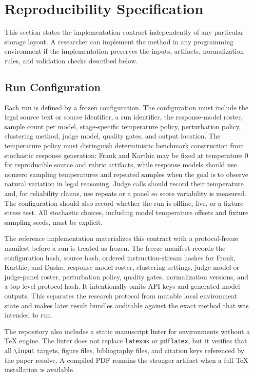 \section{Reproducibility Specification}

This section states the implementation contract independently of any particular
storage layout. A researcher can implement the method in any programming
environment if the implementation preserves the inputs, artifacts, normalization
rules, and validation checks described below.

\subsection{Run Configuration}

Each run is defined by a frozen configuration. The configuration must include
the legal source text or source identifier, a run identifier, the response-model
roster, sample count per model, stage-specific temperature policy,
perturbation policy, clustering method, judge model, quality gates, and output
location. The temperature policy must distinguish deterministic benchmark
construction from stochastic response generation: Frank and Karthic may be
fixed at temperature 0 for reproducible source and rubric artifacts, while
response models should use nonzero sampling temperatures and repeated samples
when the goal is to observe natural variation in legal reasoning. Judge calls
should record their temperature and, for reliability claims, use repeats or a
panel so score variability is measured. The configuration should also record
whether the run is offline, live, or a fixture stress test. All stochastic
choices, including model temperature offsets and fixture sampling seeds, must be
explicit.

The reference implementation materializes this contract with a protocol-freeze
manifest before a run is treated as frozen. The freeze manifest records the
configuration hash, source hash, ordered instruction-stream hashes for Frank,
Karthic, and Dasha, response-model roster, clustering settings, judge model or
judge-panel roster, perturbation policy, quality gates, normalization versions,
and a top-level protocol hash. It intentionally omits API keys and generated
model outputs. This separates the research protocol from mutable local
environment state and makes later result bundles auditable against the exact
method that was intended to run.

The repository also includes a static manuscript linter for environments without
a TeX engine. The linter does not replace \texttt{latexmk} or
\texttt{pdflatex}, but it verifies that all \texttt{\textbackslash input}
targets, figure files, bibliography files, and citation keys referenced by the
paper resolve. A compiled PDF remains the stronger artifact when a full TeX
installation is available.

